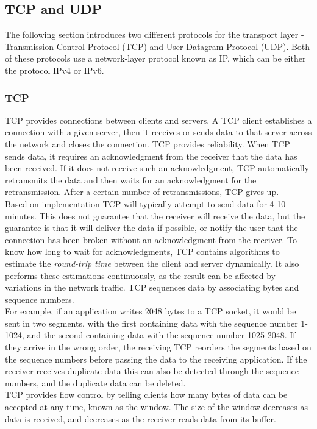 \subsection{TCP and UDP}
The following section introduces two different protocols for the transport layer - Transmission Control Protocol (TCP) and User Datagram Protocol (UDP).
Both of these protocols use a network-layer protocol known as IP, which can be either the protocol IPv4 or IPv6.

\subsubsection{TCP}
TCP provides connections between clients and servers.
A TCP client establishes a connection with a given server, then it receives or sends data to that server across the network and closes the connection.
TCP provides reliability.
When TCP sends data, it requires an acknowledgment from the receiver that the data has been received.
If it does not receive such an acknowledgment, TCP automatically retransmits the data and then waits for an acknowledgment for the retransmission.
After a certain number of retransmissions, TCP gives up.\\
Based on implementation TCP will typically attempt to send data for 4-10 minutes.
This does not guarantee that the receiver will receive the data, but the guarantee is that it will deliver the data if possible, or notify the user that the connection has been broken without an acknowledgment from the receiver.
To know how long to wait for acknowledgments, TCP contains algorithms to estimate the \textit{round-trip time} between the client and server dynamically.
It also performs these estimations continuously, as the result can be affected by variations in the network traffic.
TCP sequences data by associating bytes and sequence numbers.\\
For example, if an application writes 2048 bytes to a TCP socket, it would be sent in two segments, with the first containing data with the sequence number 1-1024, and the second containing data with the sequence number 1025-2048.
If they arrive in the wrong order, the receiving TCP reorders the segments based on the sequence numbers before passing the data to the receiving application.
If the receiver receives duplicate data this can also be detected through the sequence numbers, and the duplicate data can be deleted.\\
TCP provides flow control by telling clients how many bytes of data can be accepted at any time, known as the window.
The size of the window decreases as data is received, and decreases as the receiver reads data from its buffer.

